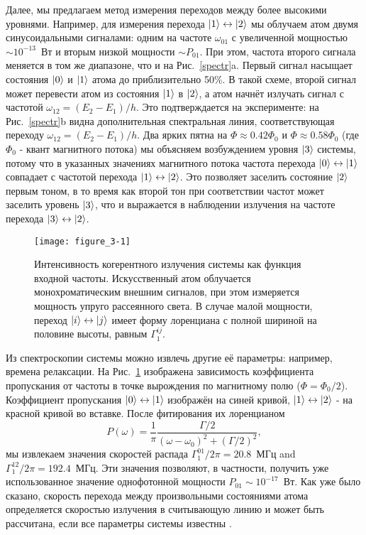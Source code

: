 Далее, мы предлагаем метод измерения переходов между более высокими уровнями. Например, для измерения перехода $\ket{1} \leftrightarrow \ket{2}$ мы облучаем атом двумя синусоидальными сигналами: одним на частоте $\omega_{01}$ с увеличенной мощностью $\sim10^{-13}$~Вт и вторым низкой мощности $\sim P_{01}$. При этом, частота второго сигнала меняется в том же диапазоне, что и на Рис.~\ref{spectr}a. Первый сигнал насыщает состояния $\ket{0}$ и $\ket{1}$ атома до приблизительно 50\%. В такой схеме, второй сигнал может перевести атом из состояния $\ket{1}$ в $\ket{2}$, а атом начнёт излучать сигнал с частотой $\omega_{12}=(E_2 - E_1)/h$. Это подтверждается на эксперименте: на Рис.~\ref{spectr}b видна дополнительная спектральная линия, соответствующая переходу $\omega_{12}=(E_2 - E_1)/h$. Два ярких пятна на $\Phi \approx 0.42 \Phi_0$ и $\Phi \approx 0.58 \Phi_0$ (где $\Phi_0$ - квант магнитного потока) мы объясняем возбуждением уровня $\ket{3}$ системы, потому что в указанных значениях магнитного потока частота перехода $\ket{0} \leftrightarrow \ket{1}$ совпадает с частотой перехода $\ket{1} \leftrightarrow \ket{2}$. Это позволяет заселить состояние $\ket{2}$ первым тоном, в то время как второй тон при соответствии частот может заселить уровень $\ket{3}$, что и выражается в наблюдении излучения на частоте перехода $\ket{3} \leftrightarrow \ket{2}$.
\begin{figure}[tbh] 
	\centering
	\texttt{[image: figure\_3-1]} 
	\caption{Интенсивность когерентного излучения системы как функция входной частоты. Искусственный атом облучается монохроматическим внешним сигналов, при этом измеряется мощность упруго рассеянного света. В случае малой мощности, переход $\ket{i} \leftrightarrow \ket{j} $ имеет форму лоренциана \cite{Astafiev2010resonance} с полной шириной на половине высоты, равным $\Gamma^{ij}_1$.
	}
	\label{peaks}
\end{figure}
Из спектроскопии системы можно извлечь другие её параметры: например, времена релаксации. На Рис.~\ref{peaks} изображена зависимость коэффициента пропускания от частоты в точке вырождения по магнитному полю ($\Phi = \Phi_0/2$). Коэффициент пропускания $\ket{0}\leftrightarrow \ket{1}$ изображён на синей кривой, $\ket{1}\leftrightarrow\ket{2}$ - на красной кривой во вставке. После фитирования их лоренцианом
\begin{equation}
	P(\omega)=\frac{1}{\pi}\frac{\Gamma/2}{(\omega-\omega_0)^2+\left(\Gamma/2\right)^2},
\end{equation} 
мы извлекаем значения скоростей распада $\Gamma_{1}^{01}/2\pi=20.8$~МГц and $\Gamma_{1}^{12}/2\pi=192.4$~МГц. Эти значения позволяют, в частности, получить уже использованное значение однофотонной мощности $P_{01} \sim 10^{-17}$~Вт. Как уже было сказано, скорость перехода между произвольными состояниями атома определяется скоростью излучения в считывающую линию и может быть рассчитана, если все параметры системы известны \cite{Astafiev-quantum-amplifier,Astafiev2010resonance}.

